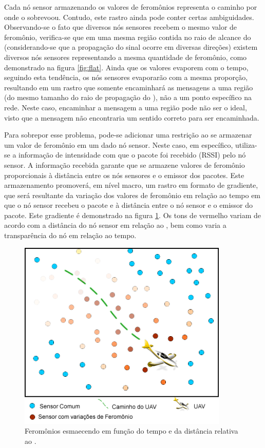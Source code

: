 Cada nó sensor armazenando os valores de feromônios representa o caminho por onde o \vant sobrevoou. Contudo, este rastro ainda pode conter certas ambiguidades. Observando-se o fato que diversos nós sensores recebem o mesmo valor de feromônio, verifica-se que em uma mesma região contida no raio de alcance do \vant (considerando-se que a propagação do sinal ocorre em diversas direções) existem diversos nós sensores representando a mesma quantidade de feromônio, como demonstrado na figura \ref{fig:flat}. Ainda que os valores evaporem com o tempo, seguindo esta tendência, os nós sensores evaporarão com a mesma proporção, resultando em um rastro que somente encaminhará as mensagens a uma região (do mesmo tamanho do raio de propagação do \vant), não a um ponto específico na rede. Neste caso, encaminhar a mensagem a uma região pode não ser o ideal, visto que a mensagem não encontraria um sentido correto para ser encaminhada.



Para sobrepor esse problema, pode-se adicionar uma restrição ao se armazenar um valor de feromônio em um dado nó sensor. Neste caso, em específico, utiliza-se a informação de intensidade com que o pacote foi recebido (RSSI) pelo nó sensor. A informação recebida garante que se armazene valores de feromônio proporcionais à distância entre os nós sensores e o emissor dos pacotes. Este armazenamento promoverá, em nível macro, um rastro em formato de gradiente, que será resultante da variação dos valores de feromônio em relação ao tempo em que o nó sensor recebeu o pacote e à distância entre o nó sensor e o \vant emissor do pacote. Este gradiente é demonstrado na figura \ref{fig:gradient}. Os tons de vermelho variam de acordo com a distância do nó sensor em relação ao \vant, bem como varia a transparência do nó em relação ao tempo.

 \begin{figure}[h!]
 \centering
 \includegraphics[width=10cm]{pictures/gradient.png}
 \caption{Feromônios esmaecendo em função do tempo e da distância relativa ao \vant.}
  \label{fig:gradient}
 \end{figure}


